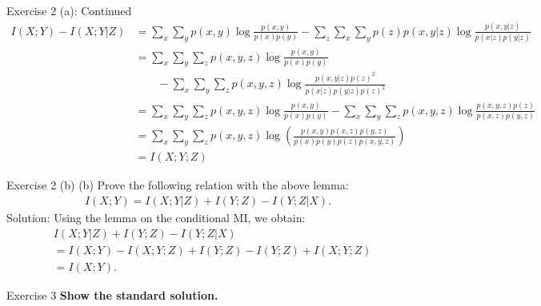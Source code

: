 \documentclass[aspectratio=169]{beamer}
\newcommand{\mixy}{I(X; Y)}
\newcommand{\miyz}{I(Y;Z)}
\newcommand{\miyzcx}{I(Y;Z|X)}
\newcommand{\mixyz}{I(X;Y;Z)}
\newcommand{\mixycz}{I(X;Y|Z)}
\newcommand{\px}{p(x)}
\newcommand{\py}{p(y)}
\newcommand{\pz}{p(z)}
\newcommand{\pxy}{p(x,y)}
\newcommand{\pxz}{p(x, z)}
\newcommand{\pyz}{p(y, z)}
\newcommand{\pxyz}{p(x, y, z)}
\newcommand{\pxycz}{p(x, y | z)}
\newcommand{\pxcz}{p(x|z)}
\newcommand{\pycz}{p(y|z)}
\begin{document}
\begin{frame}{Exercise 2 (a): Continued}
	\small
	\begin{align*}
		\mixy - \mixycz 
		&= \sum_x \sum_y \pxy \log \frac{\pxy}{\px \py} - \sum_z \sum_x \sum_y \pz \pxycz \log \frac{\pxycz}{\pxcz \pycz} \\
		&= \sum_x\sum_y\sum_z \pxyz \log \frac{\pxy}{\px \py} \\ 
		&\qquad - \sum_x \sum_y \sum_z \pxyz \log \frac{\pxycz \pz^2}{\pxcz \pycz \pz^2} \\
		&= \sum_x\sum_y\sum_z \pxyz \log \frac{\pxy}{\px \py} - \sum_x \sum_y \sum_z \pxyz \log \frac{\pxyz \pz}{\pxz \pyz} \\
		&= \sum_x \sum_y \sum_z \pxyz \log \left( \frac{\pxy \pxz \pyz}{\px \py \pz \pxyz} \right) \\
		&= \mixyz
	\end{align*}
	
\end{frame}

\begin{frame}{Exercise 2 (b)}
	(b) Prove the following relation with the above lemma:
	\begin{align*}
		\mixy = \mixycz + \miyz - \miyzcx.
	\end{align*}
	Solution: Using the lemma on the conditional MI, we obtain:
	\begin{align*}
		& \mixycz + \miyz - \miyzcx \\
		&= \mixy - \mixyz + \miyz - \miyz + \mixyz \\
		&= \mixy.
	\end{align*}
\end{frame}

\begin{frame}{Exercise 3}
	\textbf{Show the standard solution.}
\end{frame}
\end{document}
